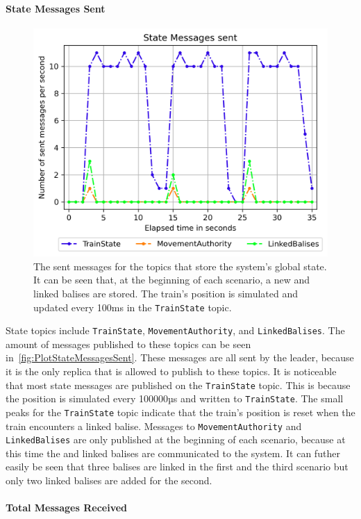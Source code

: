 \paragraph{State Messages Sent}

\begin{figure}[!hb]
	\centering
	\includegraphics[width=0.75\linewidth]{images/plots/StateMessagesSent}
	\caption{The sent messages for the topics that store the system's global state. It can be seen that, at the beginning of each scenario, a new  and linked balises are stored. The train's position is simulated and updated every 100ms in the \texttt{TrainState} topic.}
	\label{fig:PlotStateMessagesSent}
\end{figure}

State topics include \texttt{TrainState}, \texttt{MovementAuthority}, and \texttt{LinkedBalises}.
The amount of messages published to these topics can be seen in~\autoref{fig:PlotStateMessagesSent}.
These messages are all sent by the leader, because it is the only replica that is allowed to publish to these topics.
It is noticeable that most state messages are published on the \texttt{TrainState} topic.
This is because the position is simulated every 100000µs and written to \texttt{TrainState}.
The small peaks for the \texttt{TrainState} topic indicate that the train's position is reset when the train encounters a linked balise.
Messages to \texttt{MovementAuthority} and \texttt{LinkedBalises} are only published at the beginning of each scenario, because at this time the  and linked balises are communicated to the system.
It can futher easily be seen that three balises are linked in the first and the third scenario but only two linked balises are added for the second.

\paragraph{Total Messages Received}

